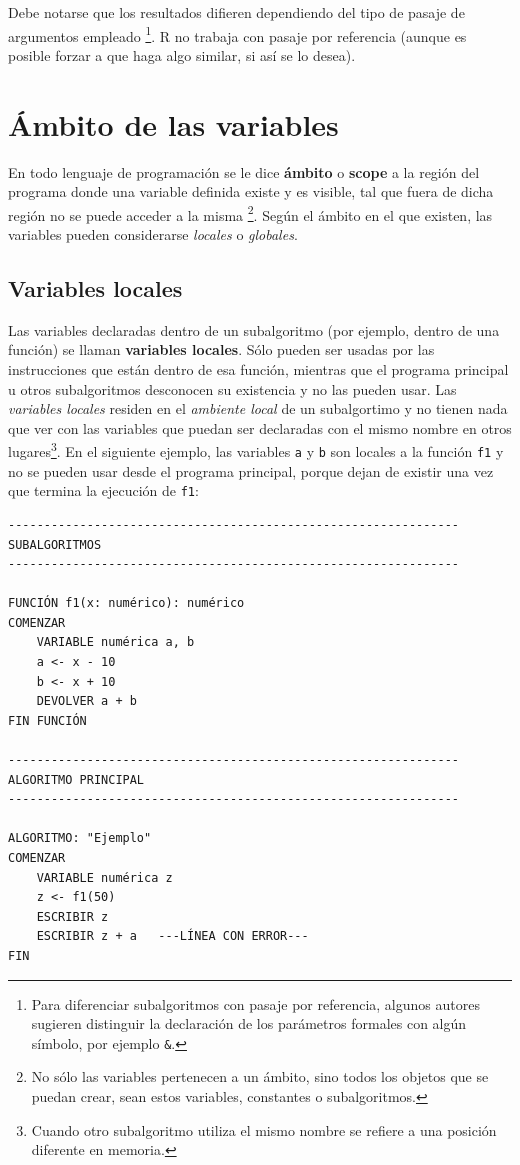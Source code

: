 \documentclass[
]{book}
\begin{document}
Debe notarse que los resultados difieren dependiendo del tipo de pasaje de argumentos empleado
\footnote{Para diferenciar subalgoritmos con pasaje por referencia, algunos autores sugieren distinguir la declaración de los parámetros formales con algún símbolo, por ejemplo \texttt{\&}.}. R no trabaja con pasaje por referencia (aunque es posible forzar a que haga algo similar, si así se lo desea).

\hypertarget{uxe1mbito-de-las-variables}{%
\section{Ámbito de las variables}\label{uxe1mbito-de-las-variables}}

En todo lenguaje de programación se le dice \textbf{ámbito} o \textbf{scope} a la región del programa donde una variable definida existe y es visible, tal que fuera de dicha región no se puede acceder a la misma
\footnote{No sólo las variables pertenecen a un ámbito, sino todos los objetos que se puedan crear, sean estos variables, constantes o subalgoritmos.}. Según el ámbito en el que existen, las variables pueden considerarse \emph{locales} o \emph{globales}.

\hypertarget{variables-locales}{%
\subsection{Variables locales}\label{variables-locales}}

Las variables declaradas dentro de un subalgoritmo (por ejemplo, dentro de una función) se llaman \textbf{variables locales}. Sólo pueden ser usadas por las instrucciones que están dentro de esa función, mientras que el programa principal u otros subalgoritmos desconocen su existencia y no las pueden usar. Las \emph{variables locales} residen en el \emph{ambiente local} de un subalgortimo y no tienen nada que ver con las variables que puedan ser declaradas con el mismo nombre en otros lugares\footnote{Cuando otro subalgoritmo utiliza el mismo nombre se refiere a una posición diferente en memoria.}. En el siguiente ejemplo, las variables \texttt{a} y \texttt{b} son locales a la función \texttt{f1} y no se pueden usar desde el programa principal, porque dejan de existir una vez que termina la ejecución de \texttt{f1}:

\begin{verbatim}
---------------------------------------------------------------
SUBALGORITMOS
---------------------------------------------------------------

FUNCIÓN f1(x: numérico): numérico
COMENZAR
    VARIABLE numérica a, b
    a <- x - 10
    b <- x + 10
    DEVOLVER a + b
FIN FUNCIÓN

---------------------------------------------------------------
ALGORITMO PRINCIPAL
---------------------------------------------------------------

ALGORITMO: "Ejemplo"
COMENZAR
    VARIABLE numérica z
    z <- f1(50)
    ESCRIBIR z
    ESCRIBIR z + a   ---LÍNEA CON ERROR---
FIN
\end{verbatim}
\end{document}
